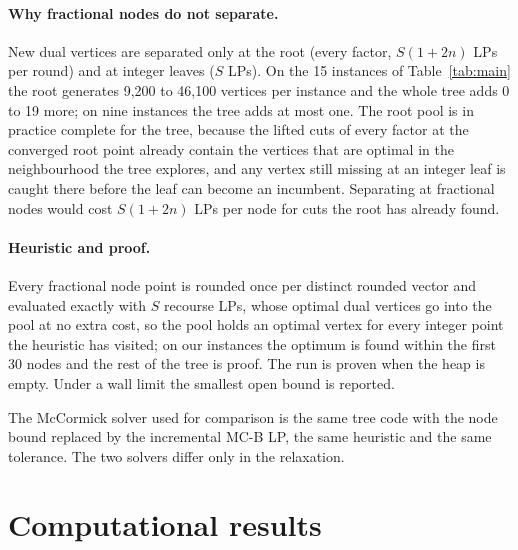 \documentclass[11pt]{article}
\begin{document}
\paragraph{Why fractional nodes do not separate.} New dual vertices are separated only at the root (every factor,
$S(1+2n)$ LPs per round) and at integer leaves ($S$ LPs). On the 15 instances of Table~\ref{tab:main} the root
generates 9,200 to 46,100 vertices per instance and the whole tree adds 0 to 19 more; on nine instances the tree
adds at most one. The root pool is in practice complete for the tree, because the lifted cuts of every factor at the
converged root point already contain the vertices that are optimal in the neighbourhood the tree explores, and any
vertex still missing at an integer leaf is caught there before the leaf can become an incumbent. Separating at
fractional nodes would cost $S(1+2n)$ LPs per node for cuts the root has already found.

\paragraph{Heuristic and proof.} Every fractional node point is rounded once per distinct rounded vector and
evaluated exactly with $S$ recourse LPs, whose optimal dual vertices go into the pool at no extra cost, so the pool
holds an optimal vertex for every integer point the heuristic has visited; on our instances the optimum is found within the first 30 nodes and the rest
of the tree is proof. The run is proven when the heap is empty. Under a wall limit the smallest open bound is reported.

The McCormick solver used for comparison is the same tree code with the node bound replaced by the incremental
\textsc{MC-B} LP, the same heuristic and the same tolerance. The two solvers differ only in the relaxation.

\section{Computational results}\label{sec:results}
\end{document}
